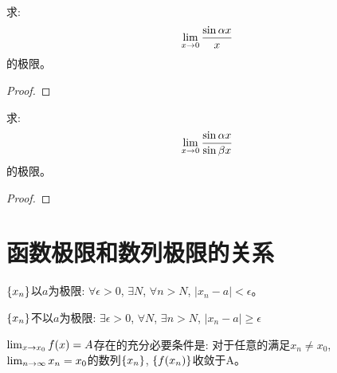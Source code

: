 \begin{proposition}
    求:
    \[ \lim_{x \to 0 } \frac{\sin \alpha x}{x} \]
    的极限。
\end{proposition}
\begin{proof}
\end{proof}

\begin{proposition}
    求:
    \[ \lim_{x \to 0 } \frac{\sin \alpha x}{\sin \beta x} \]
    的极限。
\end{proposition}
\begin{proof}
    
\end{proof}

\section{函数极限和数列极限的关系}
\begin{theorem}[否定命题的分析表示]
    $\left\{ x_n\right\}$以$a$为极限: $\forall \epsilon > 0$, $\exists N$, $\forall n > N$, $\left| x_n - a \right| < \epsilon$。

    $\left\{ x_n\right\}$不以$a$为极限: $\exists \epsilon > 0$, $\forall N$, $\exists n > N$, $\left| x_n - a \right| \ge \epsilon$
\end{theorem}
\begin{theorem}[heine定理]
    $\lim_{x \to x_0 } f(x) = A$存在的充分必要条件是: 对于任意的满足$x_n \neq x_0$, $\lim_{n \to \infty } x_n = x_0$的数列$\left\{ x_n\right\}$, $\left\{ f(x_n)\right\}$收敛于A。
\end{theorem}
